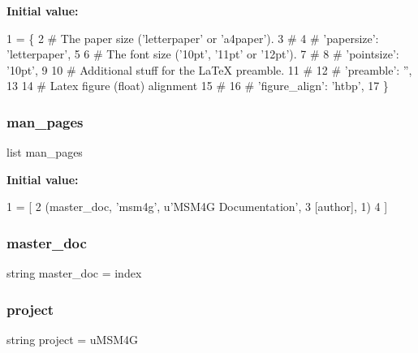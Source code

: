 {\bfseries Initial value\+:}
\begin{DoxyCode}
1 =  \{
2      \textcolor{comment}{# The paper size ('letterpaper' or 'a4paper').}
3      \textcolor{comment}{#}
4      \textcolor{comment}{# 'papersize': 'letterpaper',}
5 
6      \textcolor{comment}{# The font size ('10pt', '11pt' or '12pt').}
7      \textcolor{comment}{#}
8      \textcolor{comment}{# 'pointsize': '10pt',}
9 
10      \textcolor{comment}{# Additional stuff for the LaTeX preamble.}
11      \textcolor{comment}{#}
12      \textcolor{comment}{# 'preamble': '',}
13 
14      \textcolor{comment}{# Latex figure (float) alignment}
15      \textcolor{comment}{#}
16      \textcolor{comment}{# 'figure\_align': 'htbp',}
17 \}
\end{DoxyCode}
\hypertarget{namespaceconf_a09bebc3ead6c7c1acf6823c7a5609155}{}\label{namespaceconf_a09bebc3ead6c7c1acf6823c7a5609155} 
\subsubsection{\texorpdfstring{man\+\_\+pages}{man\_pages}}
{\footnotesize\ttfamily list man\+\_\+pages}

{\bfseries Initial value\+:}
\begin{DoxyCode}
1 =  [
2     (master\_doc, \textcolor{stringliteral}{'msm4g'}, \textcolor{stringliteral}{u'MSM4G Documentation'},
3      [author], 1)
4 ]
\end{DoxyCode}
\hypertarget{namespaceconf_a87edce364655e617d4eea122c1c5db0a}{}\label{namespaceconf_a87edce364655e617d4eea122c1c5db0a} 
\subsubsection{\texorpdfstring{master\+\_\+doc}{master\_doc}}
{\footnotesize\ttfamily string master\+\_\+doc = \textquotesingle{}index\textquotesingle{}}

\hypertarget{namespaceconf_a0af1c0d59538118611a1d7a6d8b45956}{}\label{namespaceconf_a0af1c0d59538118611a1d7a6d8b45956} 
\subsubsection{\texorpdfstring{project}{project}}
{\footnotesize\ttfamily string project = u\textquotesingle{}M\+S\+M4G\textquotesingle{}}

